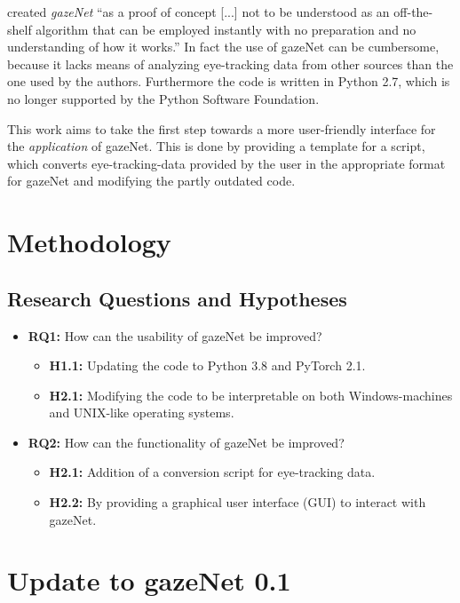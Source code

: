 \documentclass[conference]{IEEEtran}
\begin{document}
\cite{zemblys2018gazeNet} created \emph{gazeNet} ``as a proof of concept [...] not to be understood as an off-the-shelf algorithm that can be employed instantly with no preparation and no understanding of how it works.'' \cite*{zemblys2018gazeNet} In fact the use of gazeNet can be cumbersome, because it lacks means of analyzing eye-tracking data from other sources than the one used by the authors. Furthermore the code is written in Python 2.7, which is no longer supported by the Python Software Foundation.

This work aims to take the first step towards a more user-friendly interface for the \emph{application} of gazeNet. This is done by providing a template for a script, which converts eye-tracking-data provided by the user in the appropriate format for gazeNet and modifying the partly outdated code.

\section{Methodology}
\subsection{Research Questions and Hypotheses} 
\begin{itemize}
    \item \textbf{RQ1:} How can the usability of gazeNet be improved?
        \begin{itemize}
            \item \textbf{H1.1:} Updating the code to Python 3.8 and PyTorch 2.1.
            \item \textbf{H2.1:} Modifying the code to be interpretable on both Windows-machines and UNIX-like operating systems.
        \end{itemize}
    \item \textbf{RQ2:} How can the functionality of gazeNet be improved?
        \begin{itemize}
            \item \textbf{H2.1:} Addition of a conversion script for eye-tracking data.
            \item \textbf{H2.2:} By providing a graphical user interface (GUI) to interact with gazeNet.
        \end{itemize}
\end{itemize}

\section{Update to gazeNet 0.1}
\end{document}
